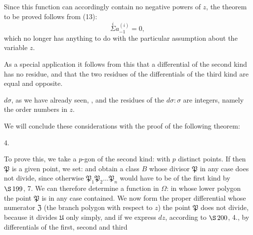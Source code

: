 Since this function can accordingly contain no negative powers of $z$, the theorem to be proved follows from (13):
\[
\overset{i}{\Sigma} a^{(i)}_{-1} = 0,
\]
which no longer has anything to do with the particular assumption about the variable $z$.

As a special application it follows from this that a differential of the second kind has no residue, and that the two residues of the differentials of the third kind are equal and opposite.

 $d\sigma$, as we have already seen, , and the residues of the \glqq{}\grqq{} $d\sigma:\sigma$ are integers, namely the order numbers in $z$.

We will conclude these considerations with the proof of the following theorem:

4. 

To prove this, we take a $p$-gon of the second kind:
with $p$ distinct points. If then $\mathfrak P$ is a given point, we set:
and obtain a class $B$ whose divisor $\mathfrak P$ in any case does not divide, since otherwise $\mathfrak P_1 \mathfrak P_2 \ldots \mathfrak P_n$
would have to be of the first kind by $\S\,199$, 7. We can therefore determine a function in $\Omega$:
in whose lower polygon the point $\mathfrak P$ is in any case contained. We now form the proper differential
whose numerator $\mathfrak Z$ (the branch polygon with respect to $z$) the point $\mathfrak P$ does not divide, because it divides $\mathfrak U$ only simply, and if we express $dz$, according to $\S\,200$, 4., by differentials of the first, second and third
